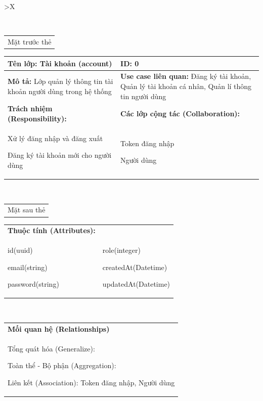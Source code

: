 \begin{xltabular}{\textwidth}{
		>{\centering\arraybackslash}X
	}
	\caption{\bfseries \fontsize{12pt}{0pt}\selectfont Thẻ CRC lớp Tài khoản người dùng}
	\\
	\begin{tabularx}{0.9\textwidth}{X}
		Mặt trước thẻ
	\end{tabularx}
	\begin{tabularx}{0.9\textwidth}{|X|X|}
		\hline
		\textbf{Tên lớp:} Tài khoản (account)                                     & \textbf{ID:} 0                                                                                           \\
		\hline
		\textbf{Mô tả:} Lớp quản lý thông tin tài khoản người dùng trong hệ thống & \textbf{Use case liên quan:}  Đăng ký tài khoản, Quản lý tài khoản cá nhân, Quản lí thông tin người dùng \\
		\hline
		\textbf{Trách nhiệm (Responsibility):}                                    & \textbf{Các lớp cộng tác (Collaboration):}                                                               \\
		Xử lý đăng nhập và đăng xuất

		Đăng ký tài khoản mới cho người dùng
		                                                                          &
		Token đăng nhập

		Người dùng
		\\
		\hline
	\end{tabularx}
	\\
	\begin{tabularx}{0.9\textwidth}{X}
		Mặt sau thẻ
	\end{tabularx}
	\begin{tabularx}{0.9\textwidth}{|X|X|}
		\hline
		\textbf{Thuộc tính (Attributes):} & \\
		id(uuid)

		email(string)

		password(string)
		                                  &
		role(integer)

		createdAt(Datetime)

		updatedAt(Datetime)
		\\ \hline
	\end{tabularx}
	\\
	\begin{tabularx}{0.9\textwidth}{|X|}
		\hline
		\textbf{Mối quan hệ (Relationships)} \\
		Tổng quát hóa (Generalize):

		Toàn thể - Bộ phận (Aggregation):

		Liên kết (Association): Token đăng nhập, Người dùng
		\\
		\hline
	\end{tabularx}
\end{xltabular}

